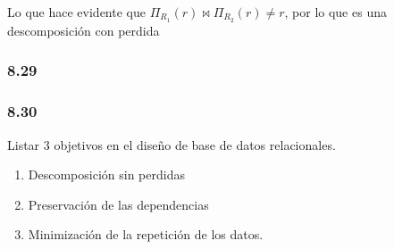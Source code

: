\documentclass[twoside]{article}
\begin{document}
Lo que hace evidente que $\Pi_{R_1}(r) \bowtie \Pi_{R_2}(r) \neq r$, por lo que es una descomposici\'on con perdida

\subsubsection*{8.29}

\subsubsection*{8.30}
Listar 3 objetivos en el diseño de base de datos relacionales.\\
\begin{enumerate}
      \item Descomposición sin perdidas
      \item Preservación de las dependencias
      \item Minimizaci\'on de la repetici\'on de los datos.
\end{enumerate}

\end{document}
